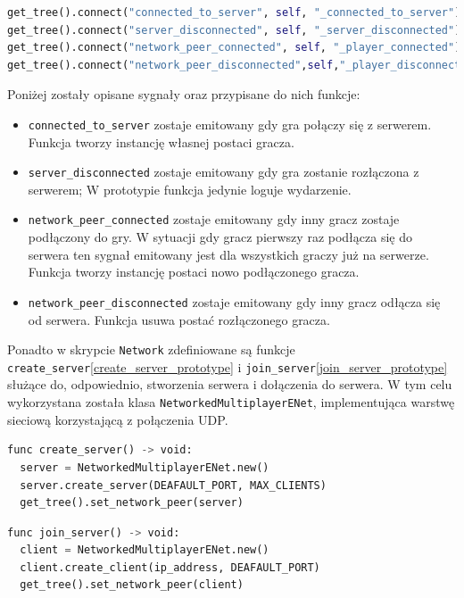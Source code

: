 \begin{lstlisting}[language=python,caption=Podłączanie do najważniejszych sygnałów sieciowych, label=lst:signal_connecting_prototype ,basicstyle=\footnotesize\ttfamily]
get_tree().connect("connected_to_server", self, "_connected_to_server")
get_tree().connect("server_disconnected", self, "_server_disconnected")
get_tree().connect("network_peer_connected", self, "_player_connected")
get_tree().connect("network_peer_disconnected",self,"_player_disconnected")
\end{lstlisting}

Poniżej zostały opisane sygnały oraz przypisane do nich funkcje:
\begin{itemize}
    \item \texttt{connected\_to\_server} zostaje emitowany gdy gra połączy się z serwerem. Funkcja tworzy instancję własnej postaci gracza.
    \item \texttt{server\_disconnected} zostaje emitowany gdy gra zostanie rozłączona z serwerem; W prototypie funkcja jedynie loguje wydarzenie.
    \item \texttt{network\_peer\_connected} zostaje emitowany gdy inny gracz zostaje podłączony do gry. W sytuacji gdy gracz pierwszy raz podłącza się do serwera ten sygnał emitowany jest dla wszystkich graczy już na serwerze. Funkcja tworzy instancję postaci nowo podłączonego gracza.
    \item \texttt{network\_peer\_disconnected} zostaje emitowany gdy inny gracz odłącza się od serwera. Funkcja usuwa postać rozłączonego gracza.
\end{itemize}

Ponadto w skrypcie \texttt{Network} zdefiniowane są funkcje \texttt{create\_server}\ref{create_server_prototype} i \texttt{join\_server}\ref{join_server_prototype} służące do, odpowiednio, stworzenia serwera i dołączenia do serwera. W tym celu wykorzystana została klasa \texttt{NetworkedMultiplayerENet}, implementująca warstwę sieciową korzystającą z połączenia UDP.


\begin{lstlisting}[language=python,caption=Funkcja inicjująca serwer gry., label=lst:create_server_prototype ,basicstyle=\footnotesize\ttfamily]
func create_server() -> void:
  server = NetworkedMultiplayerENet.new()
  server.create_server(DEAFAULT_PORT, MAX_CLIENTS)
  get_tree().set_network_peer(server)
\end{lstlisting}
\begin{lstlisting}[language=python,caption=Funkcja łącząca do serwera gry., label=lst:join_server_prototype ,basicstyle=\footnotesize\ttfamily]
func join_server() -> void:
  client = NetworkedMultiplayerENet.new()
  client.create_client(ip_address, DEAFAULT_PORT)
  get_tree().set_network_peer(client)
\end{lstlisting}

